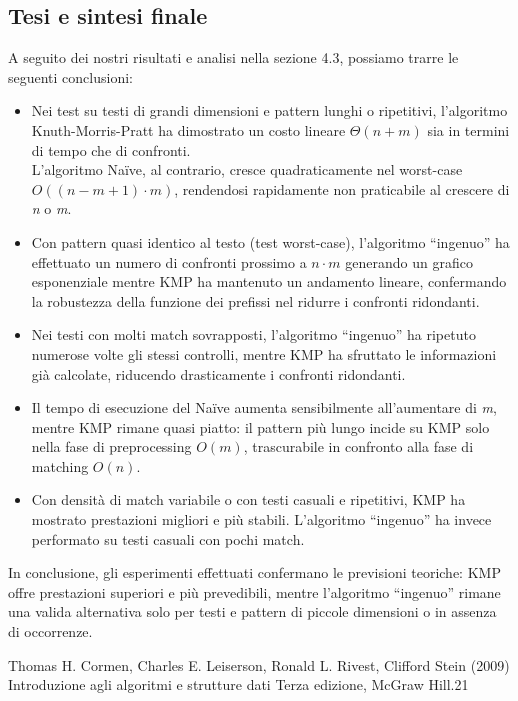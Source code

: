 \documentclass{article}
\begin{document}
\subsection{Tesi e sintesi finale}
A seguito dei nostri risultati e analisi nella sezione 4.3, possiamo trarre le seguenti conclusioni:
\begin{itemize}
    \item Nei test su testi di grandi dimensioni e pattern lunghi o ripetitivi, l'algoritmo Knuth-Morris-Pratt ha dimostrato un costo lineare $\Theta(n + m)$ sia in termini di tempo che di confronti.\\
    L'algoritmo Naïve, al contrario, cresce quadraticamente nel worst-case $O((n - m + 1) \cdot m)$, rendendosi rapidamente non praticabile al crescere di \textit{n} o \textit{m}.
    \item Con pattern quasi identico al testo (test worst-case), l'algoritmo ``ingenuo'' ha effettuato un numero di confronti prossimo a \textit{$n \cdot m$} generando un grafico esponenziale mentre KMP ha mantenuto un andamento lineare, confermando la robustezza della funzione dei prefissi nel ridurre i confronti ridondanti.
    \item Nei testi con molti match sovrapposti, l'algoritmo ``ingenuo'' ha ripetuto numerose volte gli stessi controlli, mentre KMP ha sfruttato le informazioni già calcolate, riducendo drasticamente i confronti ridondanti.
    \item Il tempo di esecuzione del Naïve aumenta sensibilmente all'aumentare di \textit{m}, mentre KMP rimane quasi piatto: il pattern più lungo incide su KMP solo nella fase di preprocessing $O(m)$, trascurabile in confronto alla fase di matching $O(n)$.
    \item Con densità di match variabile o con testi casuali e ripetitivi, KMP ha mostrato prestazioni migliori e più stabili. L'algoritmo ``ingenuo'' ha invece performato su testi casuali con pochi match.
\end{itemize}
In conclusione, gli esperimenti effettuati confermano le previsioni teoriche: KMP offre prestazioni superiori e più prevedibili, mentre l'algoritmo ``ingenuo'' rimane una valida alternativa solo per testi e pattern di piccole dimensioni o in assenza di occorrenze.

\newpage
{}
\begin{thebibliography}{9}
Thomas H. Cormen, Charles E. Leiserson, Ronald L. Rivest, Clifford Stein (2009) Introduzione agli algoritmi e strutture dati Terza edizione, McGraw Hill.21
\end{thebibliography}
\end{document}
